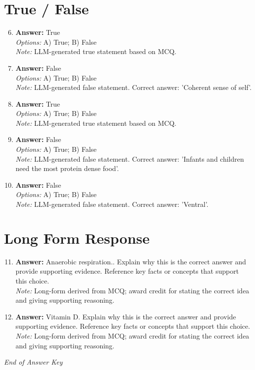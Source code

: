 \documentclass[12pt]{article}
\begin{document}
\section*{True / False}
\begin{enumerate}[label=\arabic*.]
\setcounter{enumi}{5}
\item \textbf{Answer:} True
\\ \textit{Options:} A) True; B) False
\\ \textit{Note:} LLM-generated true statement based on MCQ.
\item \textbf{Answer:} False
\\ \textit{Options:} A) True; B) False
\\ \textit{Note:} LLM-generated false statement. Correct answer: 'Coherent sense of self'.
\item \textbf{Answer:} True
\\ \textit{Options:} A) True; B) False
\\ \textit{Note:} LLM-generated true statement based on MCQ.
\item \textbf{Answer:} False
\\ \textit{Options:} A) True; B) False
\\ \textit{Note:} LLM-generated false statement. Correct answer: 'Infants and children need the most protein dense food'.
\item \textbf{Answer:} False
\\ \textit{Options:} A) True; B) False
\\ \textit{Note:} LLM-generated false statement. Correct answer: 'Ventral'.
\end{enumerate}

\section*{Long Form Response}
\begin{enumerate}[label=\arabic*.]
\setcounter{enumi}{10}
\item \textbf{Answer:} Anaerobic respiration.. Explain why this is the correct answer and provide supporting evidence. Reference key facts or concepts that support this choice.
\\ \textit{Note:} Long-form derived from MCQ; award credit for stating the correct idea and giving supporting reasoning.
\item \textbf{Answer:} Vitamin D. Explain why this is the correct answer and provide supporting evidence. Reference key facts or concepts that support this choice.
\\ \textit{Note:} Long-form derived from MCQ; award credit for stating the correct idea and giving supporting reasoning.
\end{enumerate}

\vfill
\noindent\textit{End of Answer Key}
\end{document}
